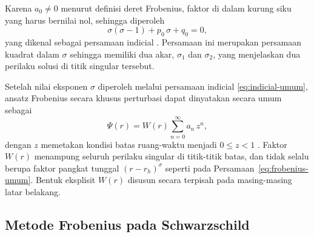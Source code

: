 Karena $a_0 \neq 0$ menurut definisi deret Frobenius, faktor di dalam kurung siku yang harus
bernilai nol, sehingga diperoleh
\begin{equation}
    \sigma(\sigma - 1) + p_0\,\sigma + q_0 = 0,
    \label{eq:indicial-umum}
\end{equation}
yang dikenal sebagai persamaan indicial \parencite{Riley2006, boas2006}. Persamaan ini
merupakan persamaan kuadrat dalam $\sigma$ sehingga memiliki dua akar, $\sigma_1$ dan
$\sigma_2$, yang menjelaskan dua perilaku solusi di titik singular tersebut.

Setelah nilai eksponen $\sigma$ diperoleh melalui persamaan indicial
\eqref{eq:indicial-umum}, ansatz Frobenius secara khusus perturbasi dapat dinyatakan secara umum sebagai
\begin{equation}
    \Psi(r) = W(r) \sum_{n=0}^{\infty} a_n\, z^n,
    \label{eq:ansatz_frobenius}
\end{equation}
dengan $z$ memetakan kondisi batas ruang-waktu menjadi $0 \le z < 1$
\parencite{Konoplya2011}. Faktor $W(r)$ menampung seluruh perilaku singular di titik-titik
batas, dan tidak selalu berupa faktor pangkat tunggal $(r-r_h)^\sigma$ seperti pada
Persamaan~\eqref{eq:frobenius-umum}. Bentuk eksplisit
$W(r)$ disusun secara terpisah pada masing-masing latar belakang.

\subsection{Metode Frobenius pada Schwarzschild}
\label{subsec:frobenius-schwarzschild}


